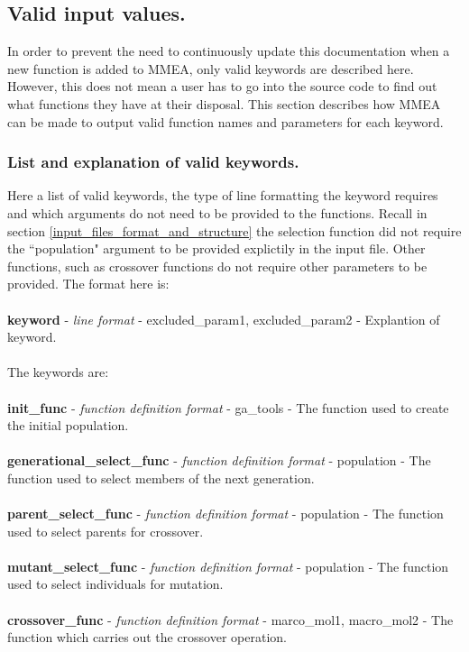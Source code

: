 \documentclass{article}
\begin{document}
\subsection{Valid input values.}
\label{input_files_valid_parameters}
In order to prevent the need to continuously update this documentation when a new function is added to MMEA, only valid keywords are described here. However, this does not mean a user has to go into the source code to find out what functions they have at their disposal. This section describes how MMEA can be made to output valid function names and parameters for each keyword.
\subsubsection{List and explanation of valid keywords.}
\label{list and explanation of valid keywords.}
Here a list of valid keywords, the type of line formatting the keyword requires and which arguments do not need to be provided to the functions. Recall in section \ref{input_files_format_and_structure} the selection function did not require the ``population" argument to be provided explictily in the input file. Other functions, such as crossover functions do not require other parameters to be provided. The format here is:
\\
\\
\textbf{keyword} - \textit{line format} - excluded\_param1, excluded\_param2 - Explantion of keyword.
\\
\\
The keywords are:
\\
\\
\textbf{init\_func} - \textit{function definition format} - ga\_tools - The function used to create the initial population.
\\
\\
\textbf{generational\_select\_func} - \textit{function definition format} - population - The function used to select members of the next generation.
\\
\\
\textbf{parent\_select\_func} - \textit{function definition format} - population - The function used to select parents for crossover.
\\
\\
\textbf{mutant\_select\_func} - \textit{function definition format} - population - The function used to select individuals for mutation.
\\
\\
\textbf{crossover\_func} - \textit{function definition format} - marco\_mol1, macro\_mol2 - The function which carries out the crossover operation.
\end{document}
